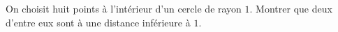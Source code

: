 On choisit huit points à l'intérieur d'un cercle de rayon $1$. Montrer que deux d'entre eux sont à une distance inférieure à $1$.
